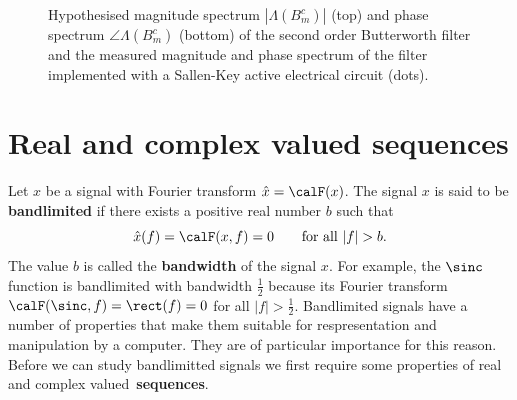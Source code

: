 \documentclass[11pt,a4paper]{book}
\theoremstyle{plain}
\numberwithin{equation}{section}
\newcommand{\term}{\textbf}
\newcommand{\abs}[1]{\left\vert #1 \right\vert}
\newcounter{test}
\begin{document}
\begin{figure}[p]
\centering
\begin{shaded}

\caption{Hypothesised magnitude spectrum $\abs{\Lambda(B_m^c)}$ (top) and phase spectrum $\angle{\Lambda(B_m^c)}$ (bottom) of the second order Butterworth filter and the measured magnitude and phase spectrum of the filter implemented with a Sallen-Key active electrical circuit (dots).}\label{fig:test:butterworthspectrum}
\end{shaded}
\end{figure}

\section{Real and complex valued sequences}

Let $x$ be a signal with Fourier transform $\hat{x} = \calF(x)$.  The signal $x$ is said to be \term{bandlimited} if there exists a positive real number $b$ such that 
\[
\hat{x}(f) = \calF(x,f) = 0 \qquad \text{for all $\abs{f} > b$}.
\]  
The value $b$ is called the \term{bandwidth} of the signal $x$.  For example, the $\sinc$ function is bandlimited with bandwidth $\tfrac{1}{2}$ because its Fourier transform $\calF(\sinc,f) = \rect(f) = 0$ for all $\abs{f} > \tfrac{1}{2}$.
Bandlimited signals have a number of properties that make them suitable for respresentation and manipulation by a computer.  They are of particular importance for this reason.  Before we can study bandlimitted signals we first require some properties of real and complex valued~\term{sequences}.
\end{document}
